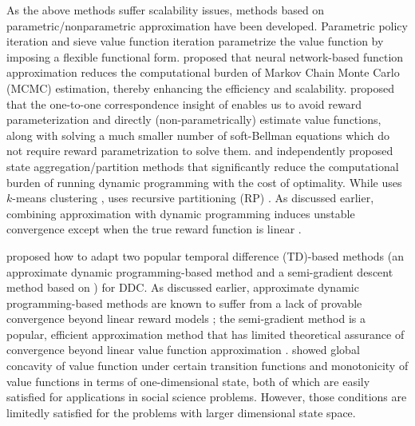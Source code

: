As the above methods suffer scalability issues, methods based on parametric/nonparametric approximation have been developed. Parametric policy iteration \citep{benitez2000comparison} and sieve value function iteration \citep{arcidiacono2013approximating} parametrize the value function by imposing a flexible functional form.  \cite{norets2012estimation} proposed that neural network-based function approximation reduces the computational burden of Markov Chain Monte Carlo (MCMC) estimation, thereby enhancing the efficiency and scalability. \cite{geng2020deep} proposed that the one-to-one correspondence insight of \cite{hotz1993conditional} enables us to avoid reward parameterization and directly (non-parametrically) estimate value functions, along with solving a much smaller number of soft-Bellman equations which do not require reward parametrization to solve them. \cite{barzegary2022recursive} and \cite{geng2023data} independently proposed state aggregation/partition methods that significantly reduce the computational burden of running dynamic programming with the cost of optimality. While \cite{geng2023data} uses $k$-means clustering \citep{kodinariya2013review, sinaga2020unsupervised}, \citet{barzegary2022recursive} uses recursive partitioning (RP) \citep{athey2016recursive}. As discussed earlier, combining approximation with dynamic programming induces unstable convergence except when the true reward function is linear \cite{jiangoffline}. 

\cite{adusumilli2019temporal} proposed how to adapt two popular temporal difference (TD)-based methods (an approximate dynamic programming-based method and a semi-gradient descent method based on \cite{tsitsiklis1996analysis}) for DDC. As discussed earlier, approximate dynamic programming-based methods are known to suffer from a lack of provable convergence beyond linear reward models \citep{jiangoffline, wang2021instabilities}; the semi-gradient method is a popular, efficient approximation method that has limited theoretical assurance of convergence beyond linear value function approximation \citep{sutton2018reinforcement}. \citet{feng2020global} showed global concavity of value function under certain transition functions and monotonicity of value functions in terms of one-dimensional state, both of which are easily satisfied for applications in social science problems. However, those conditions are limitedly satisfied for the problems with larger dimensional state space. 

